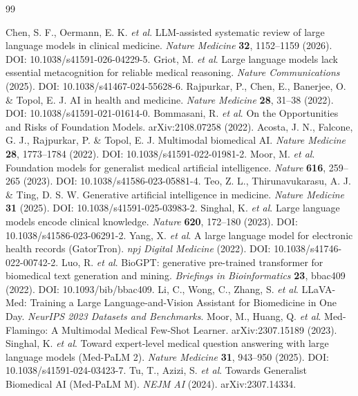 \begin{thebibliography}{99}

 Chen, S. F., Oermann, E. K. \textit{et al}. LLM-assisted systematic review of large language models in clinical medicine. \textit{Nature Medicine} \textbf{32}, 1152--1159 (2026). DOI: 10.1038/s41591-026-04229-5.
 Griot, M. \textit{et al}. Large language models lack essential metacognition for reliable medical reasoning. \textit{Nature Communications} (2025). DOI: 10.1038/s41467-024-55628-6.
 Rajpurkar, P., Chen, E., Banerjee, O. \& Topol, E. J. AI in health and medicine. \textit{Nature Medicine} \textbf{28}, 31--38 (2022). DOI: 10.1038/s41591-021-01614-0.
 Bommasani, R. \textit{et al}. On the Opportunities and Risks of Foundation Models. arXiv:2108.07258 (2022).
 Acosta, J. N., Falcone, G. J., Rajpurkar, P. \& Topol, E. J. Multimodal biomedical AI. \textit{Nature Medicine} \textbf{28}, 1773--1784 (2022). DOI: 10.1038/s41591-022-01981-2.
 Moor, M. \textit{et al}. Foundation models for generalist medical artificial intelligence. \textit{Nature} \textbf{616}, 259--265 (2023). DOI: 10.1038/s41586-023-05881-4.
 Teo, Z. L., Thirunavukarasu, A. J. \& Ting, D. S. W. Generative artificial intelligence in medicine. \textit{Nature Medicine} \textbf{31} (2025). DOI: 10.1038/s41591-025-03983-2.
 Singhal, K. \textit{et al}. Large language models encode clinical knowledge. \textit{Nature} \textbf{620}, 172--180 (2023). DOI: 10.1038/s41586-023-06291-2.
 Yang, X. \textit{et al}. A large language model for electronic health records (GatorTron). \textit{npj Digital Medicine} (2022). DOI: 10.1038/s41746-022-00742-2.
 Luo, R. \textit{et al}. BioGPT: generative pre-trained transformer for biomedical text generation and mining. \textit{Briefings in Bioinformatics} \textbf{23}, bbac409 (2022). DOI: 10.1093/bib/bbac409.
 Li, C., Wong, C., Zhang, S. \textit{et al}. LLaVA-Med: Training a Large Language-and-Vision Assistant for Biomedicine in One Day. \textit{NeurIPS 2023 Datasets and Benchmarks}.
 Moor, M., Huang, Q. \textit{et al}. Med-Flamingo: A Multimodal Medical Few-Shot Learner. arXiv:2307.15189 (2023).
 Singhal, K. \textit{et al}. Toward expert-level medical question answering with large language models (Med-PaLM 2). \textit{Nature Medicine} \textbf{31}, 943--950 (2025). DOI: 10.1038/s41591-024-03423-7.
 Tu, T., Azizi, S. \textit{et al}. Towards Generalist Biomedical AI (Med-PaLM M). \textit{NEJM AI} (2024). arXiv:2307.14334.

\end{thebibliography}
